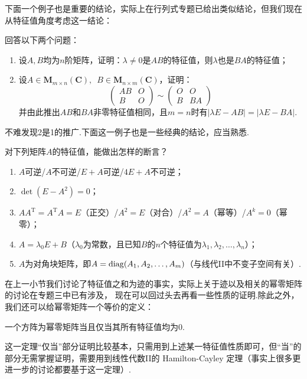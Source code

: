 下面一个例子也是重要的结论，实际上在行列式专题已给出类似结论，但我们现在从特征值角度考虑这一结论：
\begin{example}
    回答以下两个问题：
    \begin{enumerate}
        \item 设$A,B$均为$n$阶矩阵，证明：$\lambda\neq 0$是$AB$的特征值，则$\lambda$也是$BA$的特征值；

        \item 设$A\in \mathbf{M}_{m\times n}(\mathbf{C}),\enspace B\in \mathbf{M}_{n\times m}(\mathbf{C})$，证明：
        \[ \begin{pmatrix}
            AB & O \\ B & O
        \end{pmatrix}\sim\begin{pmatrix}
            O & O \\ B & BA
        \end{pmatrix} \]
        并由此推出$AB$和$BA$非零特征值相同，且$m=n$时有$|\lambda E-AB|=|\lambda E-BA|$.
    \end{enumerate}
\end{example}
不难发现2是1的推广.下面这一例子也是一些经典的结论，应当熟悉.
\begin{example}
    对下列矩阵$A$的特征值，能做出怎样的断言？
    \begin{enumerate}
        \item $A$可逆/$A$不可逆/$E+A$可逆/$4E+A$不可逆；

        \item $\det(E-A^2)=0$；

        \item $AA^\mathrm{T}=A^\mathrm{T}A=E$（正交）/$A^2=E$（对合）/$A^2=A$（幂等）/$A^k=0$（幂零）；

        \item $A=\lambda_0E+B$（$\lambda_0$为常数，且已知$B$的$n$个特征值为$\lambda_1,\lambda_2,\ldots,\lambda_n$）；

        \item $A$为对角块矩阵，即$A=\operatorname{diag}(A_1,A_2,\ldots,A_m)$（与线代II中不变子空间有关）.
    \end{enumerate}
\end{example}
在上一小节我们讨论了特征值之和为迹的事实，实际上关于迹以及相关的幂零矩阵的讨论在专题三中已有涉及，
现在可以回过头去再看一些性质的证明.除此之外，我们还可以给幂零矩阵一个等价的定义：
\begin{theorem}
    一个方阵为幂零矩阵当且仅当其所有特征值均为$0$.
\end{theorem}
这一定理``仅当''部分证明比较基本，只需用到上述某一特征值性质即可，但``当''的部分无需掌握证明，需要用到线性代数II的
Hamilton-Cayley 定理（事实上很多更进一步的讨论都要基于这一定理）.

